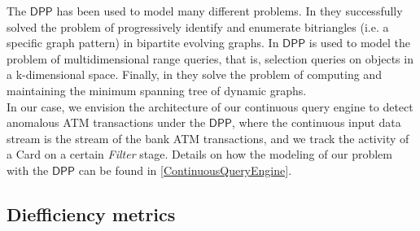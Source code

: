 The $\mathsf{DPP}$ has been used to model many different problems. In \cite{DP-bitriangles2021} they successfully solved the problem of progressively identify and enumerate bitriangles (i.e. a specific graph pattern) in bipartite evolving graphs. In \cite{DP-Lugosi_Enes_2019} $\mathsf{DPP}$ is used to model the problem of multidimensional range queries, that is, selection queries on objects in a k-dimensional space. Finally, in \cite{DP-Benedi_Garcia_2024} they solve the problem of computing and maintaining the minimum spanning tree of dynamic graphs.\\

In our case, we envision the architecture of our continuous query engine to detect anomalous ATM transactions under the $\mathsf{DPP}$, where the continuous input data stream is the stream of the bank ATM transactions, and we track the activity of a Card on a certain \emph{Filter} stage. Details on how the modeling of our problem with the $\mathsf{DPP}$ can be found in \ref{ContinuousQueryEngine}.
\subsection{Diefficiency metrics}






